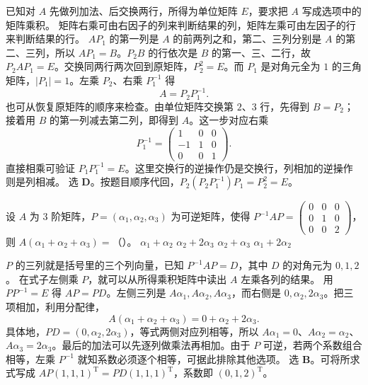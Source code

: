 \documentclass[UTF8,zihao=-4,fontset=fandol]{ctexart}
\begin{document}
\Solution
\Known 已知对 $A$ 先做列加法、后交换两行，所得为单位矩阵 $E$，要求把 $A$ 写成选项中的矩阵乘积。
\Method 矩阵右乘可由右因子的列来判断结果的列，矩阵左乘可由左因子的行来判断结果的行。
\Derive $AP_1$ 的第一列是 $A$ 的前两列之和，第二、三列分别是 $A$ 的第二、三列，所以 $AP_1=B$。$P_2B$ 的行依次是 $B$ 的第一、三、二行，故 $P_2AP_1=E$。交换同两行两次回到原矩阵，$P_2^2=E$。而 $P_1$ 是对角元全为 $1$ 的三角矩阵，$|P_1|=1$。左乘 $P_2$、右乘 $P_1^{-1}$ 得
\[
A=P_2P_1^{-1}.
\]
也可从恢复原矩阵的顺序来检查。由单位矩阵交换第 $2$、$3$ 行，先得到 $B=P_2$；接着用 $B$ 的第一列减去第二列，即得到 $A$。这一步对应右乘
\[
P_1^{-1}=\begin{pmatrix}1&0&0\\-1&1&0\\0&0&1\end{pmatrix}.
\]
直接相乘可验证 $P_1P_1^{-1}=E$。这里交换行的逆操作仍是交换行，列相加的逆操作则是列相减。
\Verify 选 \textbf{D}。按题目顺序代回，$P_2(P_2P_1^{-1})P_1=P_2^2=E$。

设 $A$ 为 $3$ 阶矩阵，$P=(\alpha_1,\alpha_2,\alpha_3)$ 为可逆矩阵，使得 $P^{-1}AP=\begin{pmatrix}0&0&0\\0&1&0\\0&0&2\end{pmatrix}$，则 $A(\alpha_1+\alpha_2+\alpha_3)=$（\quad）。
\Choices
  {$\alpha_1+\alpha_2$}
  {$\alpha_2+2\alpha_3$}
  {$\alpha_2+\alpha_3$}
  {$\alpha_1+2\alpha_2$}

\Solution
\Known $P$ 的三列就是括号里的三个列向量，已知 $P^{-1}AP=D$，其中 $D$ 的对角元为 $0,1,2$。
\Method 在式子左侧乘 $P$，就可以从所得乘积矩阵中读出 $A$ 左乘各列的结果。
\Derive 用 $PP^{-1}=E$ 得 $AP=PD$。左侧三列是 $A\alpha_1,A\alpha_2,A\alpha_3$，而右侧是 $0,\alpha_2,2\alpha_3$。把三项相加，利用分配律，
\[
A(\alpha_1+\alpha_2+\alpha_3)=0+\alpha_2+2\alpha_3.
\]
具体地，$PD=(0,\alpha_2,2\alpha_3)$，等式两侧对应列相等，所以 $A\alpha_1=0$、$A\alpha_2=\alpha_2$、$A\alpha_3=2\alpha_3$。最后的加法可以先逐列做乘法再相加。由于 $P$ 可逆，若两个系数组合相等，左乘 $P^{-1}$ 就知系数必须逐个相等，可据此排除其他选项。
\Verify 选 \textbf{B}。可将所求式写成 $AP(1,1,1)^{\mathrm T}=PD(1,1,1)^{\mathrm T}$，系数即 $(0,1,2)^{\mathrm T}$。
\end{document}
